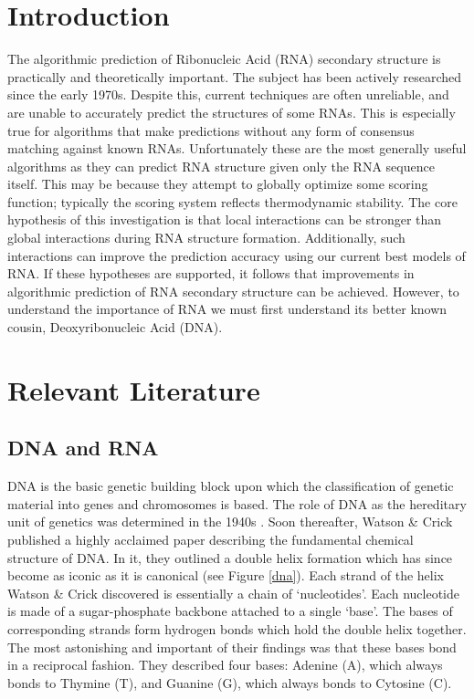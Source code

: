 \documentclass{cshonours}
\begin{document}
\tableofcontents
\listoftables  %
\listoffigures  %



\chapter{Introduction}
The algorithmic prediction of Ribonucleic Acid (RNA) secondary structure is practically and theoretically important. The subject has been actively researched since the early 1970s. Despite this, current techniques are often unreliable, and are unable to accurately predict the structures of some RNAs. This is especially true for algorithms that make predictions without any form of consensus matching against known RNAs. Unfortunately these are the most generally useful algorithms as they can predict RNA structure given only the RNA sequence itself. This may be because they attempt to globally optimize some scoring function; typically the scoring system reflects thermodynamic stability. The core hypothesis of this investigation is that local interactions can be stronger than global interactions during RNA structure formation. Additionally, such interactions can improve the prediction accuracy using our current best models of RNA. If these hypotheses are supported, it follows that improvements in algorithmic prediction of RNA secondary structure can be achieved. However, to understand the importance of RNA we must first understand its better known cousin, Deoxyribonucleic Acid (DNA).


\chapter{Relevant Literature}


\section{DNA and RNA}
DNA is the basic genetic building block upon which the classification of genetic material into genes and chromosomes is based. The role of DNA as the hereditary unit of genetics was determined in the 1940s \cite{albertsessential}. Soon thereafter, Watson \& Crick \cite{watson1953molecular} published a highly acclaimed paper describing the fundamental chemical structure of DNA. In it, they outlined a double helix formation which has since become as iconic as it is canonical (see Figure \ref{dna}). Each strand of the helix Watson \& Crick discovered is essentially a chain of `nucleotides'. Each nucleotide is made of a sugar-phosphate backbone attached to a single `base'. The bases of corresponding strands form hydrogen bonds which hold the double helix together. The most astonishing and important of their findings was that these bases bond in a reciprocal fashion. They described four bases: Adenine (A), which always bonds to Thymine (T), and Guanine (G), which always bonds to Cytosine (C).
\end{document}
